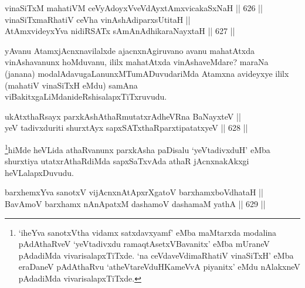 \begin{shl}
vinaSiTxM mahatiVM ceVyAdoyxV\s veVdAyxtAmx\s vicakaSxNaH \hfill || 626 ||  \\
vinaSiTxmaRhatiV ceVha vinAshAdiparxsUtitaH ||  \\
AtAmxvideyxYva nidiRSATx sAmAnAdhikaraNayxtaH \hfill || 627 ||  
\end{shl}

\begin{artha}
yAvanu AtamxjAcnxnavilalxde ajacnxnAgiruvano avanu mahatAtxda vinAshavanunx hoMduvanu, ililx mahatAtxda vinAshaveMdare? maraNa
(janana) modalAdavugaLanunxMTumADuvudariMda Atamxna avideyxye ililx (mahatiV vinaSiTxH eMdu) samAna viBakitxgaLiMda\break nideRshisalapxTiTxruvudu.
\end{artha}

\begin{shl}
ukAtxthaRsayx parxkAshAthaRmutatxrAdheVRna BaNayxteV || \\
yeV tadivxduriti shurxtAyx sapxSATxthaRparxtipatatxyeV \hfill || 628 ||  
\end{shl}

\begin{artha}
\footnote{`iheYva sanotxV\s tha vidamx satxdavxyamf' eMba maMtarxda modalina pAdAthaRveV `yeVtadivxdu ramaqtAsetxVBavanitx' eMba mUraneV pAdadiMda vivarisalapxTiTxde. `na ceVdaveVdimaRhatiV vinaSiTxH' eMba eraDaneV pAdAthaRvu `atheVtareVduHKameVvA piyanitx' eMdu nAlakxneV pAdadiMda vivarisalapxTiTxde.}hiMde heVLida athaRvanunx parxkAsha paDisalu `yeVtadivxduH' eMba shurxtiya utatxrAthaRdiMda sapxSaTxvAda athaR jAcnxnakAkxgi heVLalapxDuvudu.
\end{artha}


\begin{shl}
barxhemxYva sanotxV vijAcnxnAtApxrXgatoV barxhamxboVdhataH || \\
BavAmoV barxhamx nAnApatxM dashamoV dashamaM yathA \hfill || 629 ||  
\end{shl}

